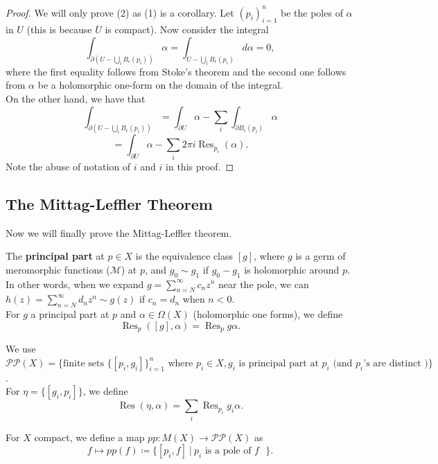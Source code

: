 \documentclass{article}
\begin{document}
{\begin{proof}
    We will only prove (2) as (1) is a corollary. Let $(p_i)_{i=1}^n$ be the poles of $\alpha$ in $U$ (this is because $\overline{U}$ is compact). Now consider the integral
    \[\int_{\partial (U - \bigcup_{i} B_\epsilon(p_i))} \alpha = \int_{U - \bigcup_{i} B_\epsilon(p_i)} d\alpha = 0,\]
    where the first equality follows from Stoke's theorem and the second one follows from $\alpha$ be a holomorphic one-form on the domain of the integral.\\

    On the other hand, we have that
    \[\int_{\partial (U - \bigcup_{i} B_\epsilon(p_i))}  = \int_{\partial U} \alpha - \sum_{i} \int_{\partial B_\epsilon(p_i)} \alpha \]
    \[= \int_{\partial U} \alpha - \sum_{i} 2\pi i \operatorname{Res}_{p_i}(\alpha).\]
    Note the abuse of notation of $i$ and $i$ in this proof.
\end{proof}

\subsection{The Mittag-Leffler Theorem}

Now we will finally prove the Mittag-Leffler theorem.

\begin{definition}
    The \textbf{principal part} at $p \in X$ is the equivalence class $[g]$, where $g$ is a germ of meromorphic functions ($\mathcal{M}$) at $p$, and $g_0 \sim g_1$ if $g_0 - g_1$ is holomorphic around $p$. In other words, when we expand $g = \sum_{n = N}^\infty c_n z^n$ near the pole, we can $h(z) = \sum_{n = N}^\infty d_n z^n \sim g(z)$ if $c_n = d_n$ when $n < 0$.\\

    For $g$ a principal part at $p$ and $\alpha \in \Omega(X)$ (holomorphic one forms), we define
    \[\operatorname{Res}_p([g], \alpha) = \operatorname{Res}_p g\alpha.\]

    We use $\mathcal{P} \mathcal{P}(X) = \{\text{finite sets } \{[p_i, g_i]\}_{i = 1}^n \text{ where } p_i \in X, g_i \text{ is principal part at } p_i \text{ (and $p_i$'s are distinct })\}$.\\

    For $\eta = \{[g_i, p_i]\}$, we define
    \[\operatorname{Res}(\eta, \alpha) = \sum_i \operatorname{Res}_{p_i} g_i \alpha.\]
\end{definition}

For $X$ compact, we define a map $pp: M(X) \to \mathcal{P} \mathcal{P}(X)$ as
\[f \mapsto pp(f) \coloneqq \{[p_i, f]\ |\ p_i \text{ is a pole of $f$ }\}.\]

}
\end{document}
